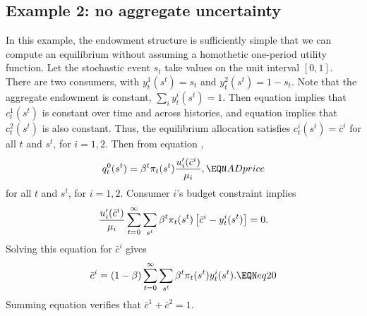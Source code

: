 \subsection{Example 2: no aggregate uncertainty}\label{sec:example2GG}%
In this example, the endowment structure is sufficiently simple that we can compute an equilibrium without assuming a homothetic
one-period utility function. Let the stochastic event $s_t$ take values on the unit interval
$[0,1]$.  There are two consumers, with $ y_t^1(s^t) =s_t$ and
$y_t^2(s^t) =1-s_t$.  Note that the aggregate endowment is
constant, $\sum_i y_t^i(s^t) =1$.  Then equation  implies
that $c_t^1(s^t)$ is constant over time and across histories, and
equation  implies that $c_t^2(s^t)$ is also constant.
Thus, the equilibrium allocation satisfies
$c_t^i(s^t) = \bar c^i$ for all $t$ and $s^t$, for $i=1,2$.  Then
from equation ,
$$ q_t^0(s^t) = \beta^t \pi_t(s^t) {u'_i(\bar c^i) \over \mu_i}, \EQN ADprice $$
for all $t$ and $s^t$, for $i=1,2$.  Consumer $i$'s budget constraint
implies
 $$ {u'_i(\bar c^i) \over \mu_i} \sum_{t=0}^\infty \sum_{s^t} \beta^t \pi_t(s^t)
\left[\bar c^i - y_t^i(s^t)\right] = 0 .$$ Solving this equation
for $\bar c^i$ gives
$$ \bar c^i =( 1 -\beta) \sum_{t=0}^\infty \sum_{s^t} \beta^t \pi_t(s^t) y_t^i(s^t) .
      \EQN eq20 $$
Summing equation   verifies that $\bar c^1 + \bar c^2
=1$.


